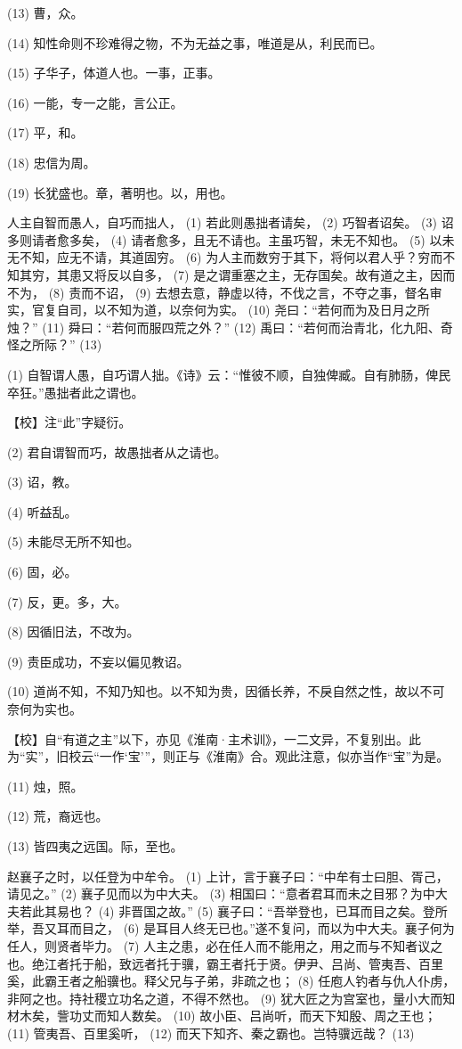\documentclass[12pt,UTF8]{ctexbook}
\begin{document}
(13) 曹，众。

(14) 知性命则不珍难得之物，不为无益之事，唯道是从，利民而已。

(15) 子华子，体道人也。一事，正事。

(16) 一能，专一之能，言公正。

(17) 平，和。

(18) 忠信为周。

(19) 长犹盛也。章，著明也。以，用也。

人主自智而愚人，自巧而拙人， (1) 若此则愚拙者请矣， (2) 巧智者诏矣。 (3) 诏多则请者愈多矣， (4) 请者愈多，且无不请也。主虽巧智，未无不知也。 (5) 以未无不知，应无不请，其道固穷。 (6) 为人主而数穷于其下，将何以君人乎？穷而不知其穷，其患又将反以自多， (7) 是之谓重塞之主，无存国矣。故有道之主，因而不为， (8) 责而不诏， (9) 去想去意，静虚以待，不伐之言，不夺之事，督名审实，官复自司，以不知为道，以奈何为实。 (10) 尧曰：“若何而为及日月之所烛？” (11) 舜曰：“若何而服四荒之外？” (12) 禹曰：“若何而治青北，化九阳、奇怪之所际？” (13)

(1) 自智谓人愚，自巧谓人拙。《诗》云：“惟彼不顺，自独俾臧。自有肺肠，俾民卒狂。”愚拙者此之谓也。

【校】注“此”字疑衍。

(2) 君自谓智而巧，故愚拙者从之请也。

(3) 诏，教。

(4) 听益乱。

(5) 未能尽无所不知也。

(6) 固，必。

(7) 反，更。多，大。

(8) 因循旧法，不改为。

(9) 责臣成功，不妄以偏见教诏。

(10) 道尚不知，不知乃知也。以不知为贵，因循长养，不戾自然之性，故以不可奈何为实也。

【校】自“有道之主”以下，亦见《淮南·主术训》，一二文异，不复别出。此为“实”，旧校云“一作‘宝’”，则正与《淮南》合。观此注意，似亦当作“宝”为是。

(11) 烛，照。

(12) 荒，裔远也。

(13) 皆四夷之远国。际，至也。

赵襄子之时，以任登为中牟令。 (1) 上计，言于襄子曰：“中牟有士曰胆、胥己，请见之。” (2) 襄子见而以为中大夫。 (3) 相国曰：“意者君耳而未之目邪？为中大夫若此其易也？ (4) 非晋国之故。” (5) 襄子曰：“吾举登也，已耳而目之矣。登所举，吾又耳而目之， (6) 是耳目人终无已也。”遂不复问，而以为中大夫。襄子何为任人，则贤者毕力。 (7) 人主之患，必在任人而不能用之，用之而与不知者议之也。绝江者托于船，致远者托于骥，霸王者托于贤。伊尹、吕尚、管夷吾、百里奚，此霸王者之船骥也。释父兄与子弟，非疏之也； (8) 任庖人钓者与仇人仆虏，非阿之也。持社稷立功名之道，不得不然也。 (9) 犹大匠之为宫室也，量小大而知材木矣，訾功丈而知人数矣。 (10) 故小臣、吕尚听，而天下知殷、周之王也； (11) 管夷吾、百里奚听， (12) 而天下知齐、秦之霸也。岂特骥远哉？ (13)
\end{document}
